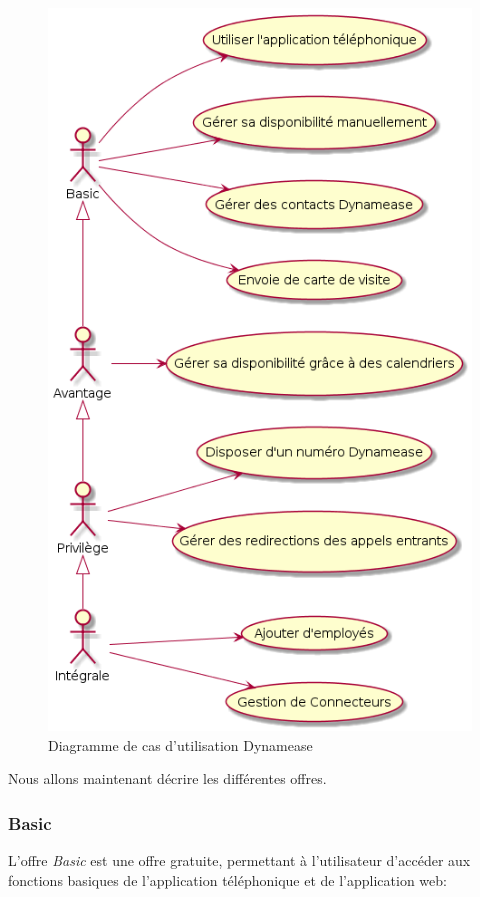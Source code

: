 \begin{figure}[!h]
	\includegraphics[scale=0.5]{img/useCase.png}
	\caption{\label{useCase} Diagramme de cas d'utilisation Dynamease}
\end{figure}

Nous allons maintenant décrire les différentes offres.

\subsubsection{Basic}

L'offre \textit{Basic} est une offre gratuite, permettant à l'utilisateur d'accéder aux fonctions basiques de l'application téléphonique et de l'application web:

